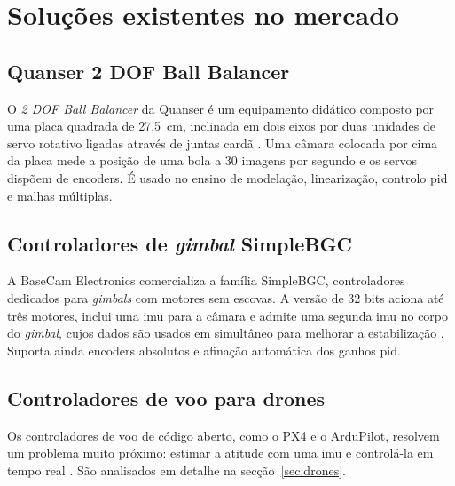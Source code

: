 \section{Soluções existentes no mercado}

\subsection{Quanser 2 DOF Ball Balancer}
O \textit{2 DOF Ball Balancer} da Quanser é um equipamento didático composto por uma placa quadrada de 27,5~cm, inclinada em dois eixos por duas unidades de servo rotativo ligadas através de juntas cardã \cite{quanser2dof}. Uma câmara colocada por cima da placa mede a posição de uma bola a 30 imagens por segundo e os servos dispõem de encoders. É usado no ensino de modelação, linearização, controlo \gls{pid} e malhas múltiplas.

\subsection{Controladores de \textit{gimbal} SimpleBGC}
A BaseCam Electronics comercializa a família SimpleBGC, controladores dedicados para \textit{gimbals} com motores sem escovas. A versão de 32 bits aciona até três motores, inclui uma \gls{imu} para a câmara e admite uma segunda \gls{imu} no corpo do \textit{gimbal}, cujos dados são usados em simultâneo para melhorar a estabilização \cite{simplebgc,simplebgcman}. Suporta ainda encoders absolutos e afinação automática dos ganhos \gls{pid}.

\subsection{Controladores de voo para drones}
Os controladores de voo de código aberto, como o PX4 e o ArduPilot, resolvem um problema muito próximo: estimar a atitude com uma \gls{imu} e controlá-la em tempo real \cite{px4ctrl,ardupilotatt}. São analisados em detalhe na secção~\ref{sec:drones}.

